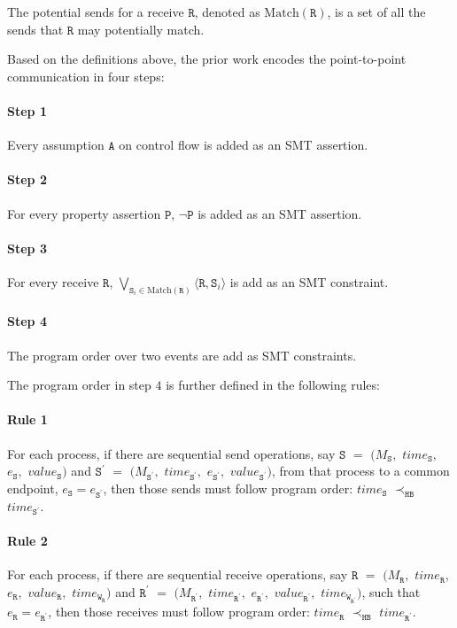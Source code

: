 \begin{definition}\label{def:potential}
The potential sends for a receive $\mathtt{R}$, denoted as $\mathrm{Match}(\mathtt{R})$, is a set of all the sends that $\mathtt{R}$ may potentially match.
\end{definition}

Based on the definitions above, the prior work encodes the point-to-point communication in four steps: 

\paragraph*{Step 1} Every assumption $\mathtt{A}$ on control flow is added as an SMT assertion.
\paragraph*{Step 2} For every property assertion $\mathtt{P}$, $\neg \mathtt{P}$ is added as an SMT assertion.
\paragraph*{Step 3} For every receive $\mathtt{R}$, $\bigvee_{\mathtt{S}_i \in \mathrm{Match}(\mathtt{R})} \langle\mathtt{R},\mathtt{S}_i\rangle$ is add as an SMT constraint. 
\paragraph*{Step 4} The program order over two events are add as SMT constraints. 

The program order in step $4$ is further defined in the following rules: 

\paragraph*{Rule 1} For each process, if there are sequential send
operations, say $\mathtt{S}$ $=$ $(M_\mathtt{S},$ $\mathit{time}_\mathtt{S},$ $e_\mathtt{S},$ $\mathit{value}_\mathtt{S})$ and $\mathtt{S^\prime}$ $=$ $(M_\mathtt{S^\prime},$ $\mathit{time}_\mathtt{S^\prime},$ $e_\mathtt{S^\prime},$ $\mathit{value}_\mathtt{S^\prime})$, from that process 
to a common endpoint, $e_\mathtt{S} = e_\mathtt{S^\prime}$, then those
sends must follow program order: $\mathit{time}_\mathtt{S}$
$\prec_\mathtt{HB}$ $\mathit{time}_\mathtt{S^\prime}$.

\paragraph*{Rule 2} For each process, if there are sequential receive
operations, say $\mathtt{R}$ $=$ $(M_\mathtt{R},$ $\mathit{time}_\mathtt{R},$ $e_\mathtt{R},$ $\mathit{value}_\mathtt{R},$ $\mathit{time}_{\mathtt{W}_\mathtt{R}})$ and $\mathtt{R^\prime}$ $=$ $(M_\mathtt{R^\prime},$ $\mathit{time}_\mathtt{R^\prime},$ $e_\mathtt{R^\prime},$ $\mathit{value}_\mathtt{R^\prime},$ $\mathit{time}_{\mathtt{W}_\mathtt{R^\prime}})$, such that $e_\mathtt{R} = e_\mathtt{R^\prime}$, then those
receives must follow program order: $\mathit{time}_\mathtt{R}$
$\prec_\mathtt{HB}$ $\mathit{time}_\mathtt{R^\prime}$.


